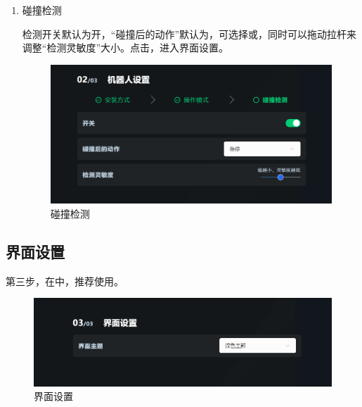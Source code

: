 \begin{enumerate}
\clearpage

\item 碰撞检测

	检测开关默认为开，“碰撞后的动作”默认为，可选择或，同时可以拖动拉杆来调整“检测灵敏度”大小。点击，进入界面设置。

	\begin{figure}[ht]
		\centering
		\includegraphics[width=\textwidth]{screen/2-8.png}
		\caption{碰撞检测}
		\label{fig:碰撞检测}
	\end{figure}


\end{enumerate}

\clearpage

\subsection{界面设置}

第三步，在中，推荐使用。

\begin{figure}[ht]
	\centering
	\includegraphics[width=\textwidth]{screen/2-9.png}
	\caption{界面设置}
	\label{fig:界面设置}
\end{figure}

